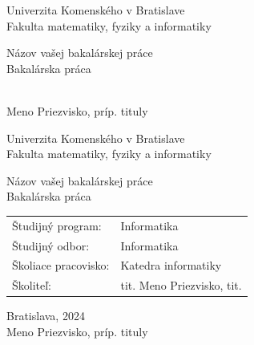\documentclass[12pt, twoside]{book}
\def\mfrok{2024}
\def\mfnazov{Názov vašej bakalárskej práce}
\def\mftyp{Bakalárska práca}
\def\mfautor{Meno Priezvisko, príp. tituly}
\def\mfskolitel{tit. Meno Priezvisko, tit. }
\def\mfkonzultant{tit. Meno Priezvisko, tit. }
\def\mfmiesto{Bratislava, \mfrok}
\def\mfodbor{ Informatika}
\def\program{ Informatika }
\def\mfpracovisko{ Katedra informatiky }
\begin{document}
     
\frontmatter
\pagestyle{empty}


\begin{center}
\sc\large
Univerzita Komenského v Bratislave\\
Fakulta matematiky, fyziky a informatiky

\vfill

{\LARGE\mfnazov}\\
\mftyp
\end{center}

\vfill

{\sc\large 
\noindent \mfrok\\
\mfautor
}

\cleardoublepage



\noindent

\begin{center}
\sc  
\large
Univerzita Komenského v Bratislave\\
Fakulta matematiky, fyziky a informatiky

\vfill

{\LARGE\mfnazov}\\
\mftyp
\end{center}

\vfill

\noindent
\begin{tabular}{ll}
Študijný program: & \program \\
Študijný odbor: & \mfodbor \\
Školiace pracovisko: & \mfpracovisko \\
Školiteľ: & \mfskolitel \\
\end{tabular}

\vfill


\noindent \mfmiesto\\
\mfautor

\cleardoublepage



\newpage 
\setcounter{page}{3}

\end{document}
